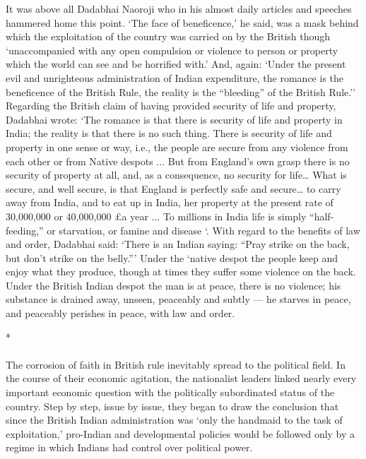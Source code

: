It was above all Dadabhai Naoroji who in his almost daily articles and speeches hammered home this point. `The face of beneficence,' he said, was a mask behind which the exploitation of the country was carried on by the British though `unaccompanied with any open compulsion or violence to person or property which the world can see and be horrified with.' And, again: `Under the present evil and unrighteous administration of Indian expenditure, the romance is the beneficence of the British Rule, the reality is the ``bleeding'' of the British Rule.'' Regarding the British claim of having provided security of life and property, Dadabhai wrote: `The romance is that there is security of life and property in India; the reality is that there is no such thing. There is security of life and property in one sense or way, i.e., the people are secure from any violence from each other or from Native despots ... But from England's own grasp there is no security of property at all, and, as a consequence, no security for life… What is secure, and well secure, is that England is perfectly safe and secure… to carry away from India, and to eat up in India, her property at the present rate of 30,000,000 or 40,000,000 \pounds a year ... To millions in India life is simply ``half-feeding,'' or starvation, or famine and disease `. With regard to the benefits of law and order, Dadabhai said: `There is an Indian saying: ``Pray strike on the back, but don't strike on the belly.''' Under the `native despot the people keep and enjoy what they produce, though at times they suffer some violence on the back. Under the British Indian despot the man is at peace, there is no violence; his substance is drained away, unseen, peaceably and subtly --- he starves in peace, and peaceably perishes in peace, with law and order.

\begin{center}*\end{center}

\paragraph*{}

The corrosion of faith in British rule inevitably spread to the political field. In the course of their economic agitation, the nationalist leaders linked nearly every important economic question with the politically subordinated status of the country. Step by step, issue by issue, they began to draw the conclusion that since the British Indian administration was `only the handmaid to the task of exploitation,' pro-Indian and developmental policies would be followed only by a regime in which Indians had control over political power.

